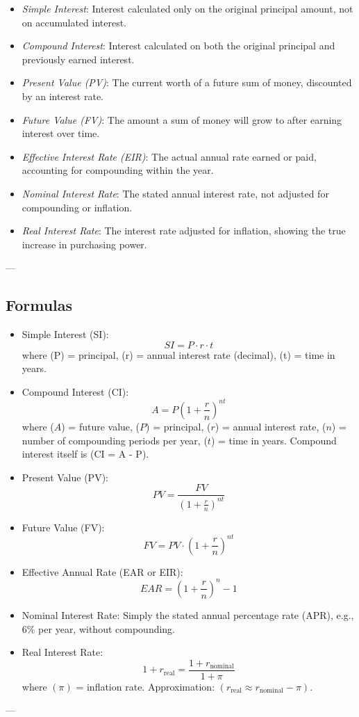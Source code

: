 \documentclass[handout,space,nooutcomes]{ximera}
\begin{document}
\begin{itemize}
\item \emph{Simple Interest}: Interest calculated only on the original principal amount, not on accumulated interest.
\item \emph{Compound Interest}: Interest calculated on both the original principal and previously earned interest.
\item \emph{Present Value (PV)}: The current worth of a future sum of money, discounted by an interest rate.
\item \emph{Future Value (FV)}: The amount a sum of money will grow to after earning interest over time.
\item \emph{Effective Interest Rate (EIR)}: The actual annual rate earned or paid, accounting for compounding within the year.
\item \emph{Nominal Interest Rate}: The stated annual interest rate, not adjusted for compounding or inflation.
\item \emph{Real Interest Rate}: The interest rate adjusted for inflation, showing the true increase in purchasing power.
\end{itemize}


---

\subsection{Formulas}
\begin{itemize}
\item Simple Interest (SI):
 \[
  SI = P \cdot r \cdot t
 \]
  where (P) = principal, (r) = annual interest rate (decimal), (t) = time in years.

\item Compound Interest (CI):
 \[
  A = P \left(1 + \frac{r}{n}\right)^{nt}
 \]
  where ($A$) = future value, ($P$) = principal, ($r$) = annual interest rate, ($n$) = number of compounding periods per year, ($t$) = time in years.
  Compound interest itself is (CI = A - P).

\item Present Value (PV):
 \[
  PV = \frac{FV}{\left(1 + \frac{r}{n}\right)^{nt}}
 \]

\item Future Value (FV):
 \[
  FV = PV \cdot \left(1 + \frac{r}{n}\right)^{nt}
 \]

\item Effective Annual Rate (EAR or EIR):
 \[
  EAR = \left(1 + \frac{r}{n}\right)^n - 1
 \]

\item Nominal Interest Rate:
  Simply the stated annual percentage rate (APR), e.g., 6\% per year, without compounding.

\item Real Interest Rate:
 \[
  1 + r_{\text{real}} = \frac{1 + r_{\text{nominal}}}{1 + \pi}
 \]
  where $(\pi)$ = inflation rate. Approximation: $(r_{\text{real}} \approx r_{\text{nominal}} - \pi)$.

\end{itemize}
---
\end{document}
